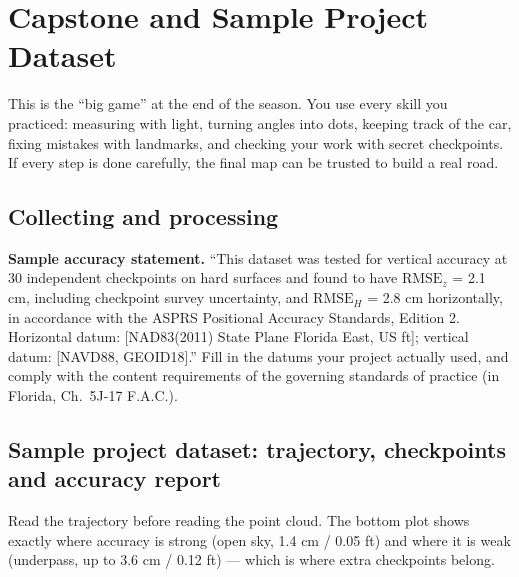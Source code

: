 \chapter{Capstone and Sample Project Dataset}

\begin{kid}
This is the ``big game'' at the end of the season. You use every skill you practiced: measuring with light, turning angles into dots, keeping track of the car, fixing mistakes with landmarks, and checking your work with secret checkpoints. If every step is done carefully, the final map can be trusted to build a real road.
\end{kid}

\section{Collecting and processing}

\begin{tip}
\textbf{Sample accuracy statement.} ``This dataset was tested for vertical accuracy at 30 independent checkpoints on hard surfaces and found to have $\text{RMSE}_z$ = 2.1 cm, including checkpoint survey uncertainty, and $\text{RMSE}_H$ = 2.8 cm horizontally, in accordance with the ASPRS Positional Accuracy Standards, Edition 2. Horizontal datum: [NAD83(2011) State Plane Florida East, US ft]; vertical datum: [NAVD88, GEOID18].'' Fill in the datums your project actually used, and comply with the content requirements of the governing standards of practice (in Florida, Ch.\ 5J-17 F.A.C.).
\end{tip}

\section{Sample project dataset: trajectory, checkpoints and accuracy report}\label{sec:dataset}


\begin{bigidea}
Read the trajectory before reading the point cloud. The bottom plot shows exactly where accuracy is strong (open sky, 1.4 cm / 0.05 ft) and where it is weak (underpass, up to 3.6 cm / 0.12 ft) --- which is where extra checkpoints belong.
\end{bigidea}

